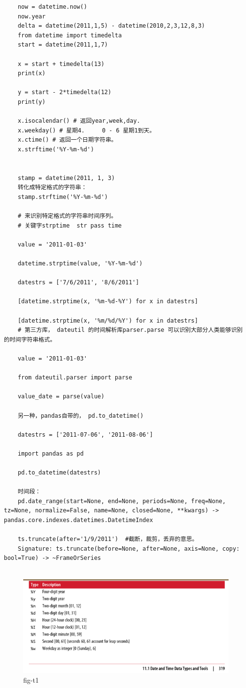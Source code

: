 \documentclass{article}
\begin{document}
\begin{lstlisting}
	now = datetime.now()
	now.year
	delta = datetime(2011,1,5) - datetime(2010,2,3,12,8,3)
	from datetime import timedelta
	start = datetime(2011,1,7)
	
	x = start + timedelta(13)
	print(x)
	
	y = start - 2*timedelta(12)
	print(y)
	
	x.isocalendar() # 返回year,week,day.
	x.weekday() # 星期4.     0 - 6 星期1到天。
	x.ctime() # 返回一个日期字符串。
	x.strftime('%Y-%m-%d')
	
	
	stamp = datetime(2011, 1, 3)
	转化成特定格式的字符串：
	stamp.strftime('%Y-%m-%d')
	
	# 来识别特定格式的字符串时间序列。 
	# 关键字strptime  str pass time
	
	value = '2011-01-03'
	
	datetime.strptime(value, '%Y-%m-%d')
	
	datestrs = ['7/6/2011', '8/6/2011']
	
	[datetime.strptime(x, '%m-%d-%Y') for x in datestrs] 
	
	[datetime.strptime(x, '%m/%d/%Y') for x in datestrs]
	# 第三方库， dateutil 的时间解析库parser.parse 可以识别大部分人类能够识别的时间字符串格式。
	
	value = '2011-01-03'
	
	from dateutil.parser import parse
	
	value_date = parse(value)
	
	另一种，pandas自带的， pd.to_datetime()
	
	datestrs = ['2011-07-06', '2011-08-06']
	
	import pandas as pd
	
	pd.to_datetime(datestrs)
	
	时间段：
	pd.date_range(start=None, end=None, periods=None, freq=None, tz=None, normalize=False, name=None, closed=None, **kwargs) -> pandas.core.indexes.datetimes.DatetimeIndex
	
	ts.truncate(after='1/9/2011')  #截断，裁剪，丢弃的意思。
	Signature: ts.truncate(before=None, after=None, axis=None, copy: bool=True) -> ~FrameOrSeries
	
\end{lstlisting}
\begin{figure}[htpb]
	\centering
	\includegraphics[width=\linewidth]{fig/t1}
	\caption{fig-t1}
	\label{fig-t1}
\end{figure}
\end{document}
